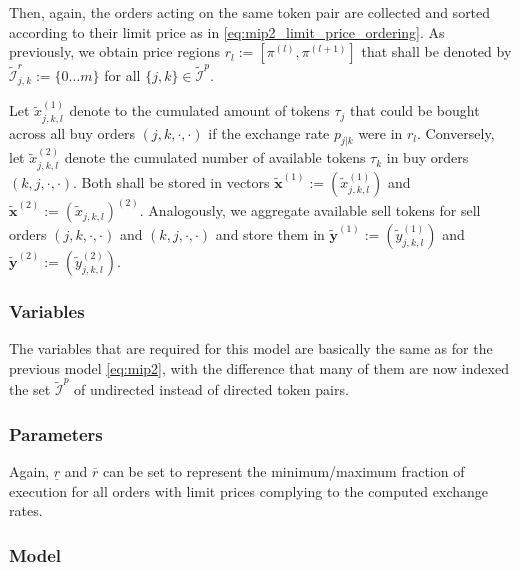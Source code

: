 \documentclass[11pt,parskip=full]{scrartcl}%
\newcommand*{\iutokenpairs}{\tilde{\mathcal{I}}^p}   %
\begin{document}
Then, again, the orders acting on the same token pair are collected and sorted according to their
limit price as in \eqref{eq:mip2_limit_price_ordering}.
As previously, we obtain price regions $ r_l := [\pi^{(l)},\pi^{(l+1)}] $ that shall be denoted by
$ \tilde{\mathcal{I}}_{j,k}^r := \{0 \ldots m\} $ for all $ \{j,k\} \in \iutokenpairs $.

Let $ \tilde{x}_{j,k,l}^{(1)} $ denote to the cumulated amount of tokens $ \tau_j $ that could be
bought across all buy orders $ (j,k,\cdot,\cdot) $ if the exchange rate $ p_{j|k} $ were in
$ r_l $.
Conversely, let $ \tilde{x}_{j,k,l}^{(2)} $ denote the cumulated number of available tokens
$ \tau_k $ in buy orders $ (k,j,\cdot,\cdot) $.
Both shall be stored in vectors $ \tilde{\mathbf{x}}^{(1)} := (\tilde{x}_{j,k,l}^{(1)}) $ and
$ \tilde{\mathbf{x}}^{(2)} := (\tilde{x}_{j,k,l})^{(2)} $.
Analogously, we aggregate available sell tokens for sell orders $ (j,k,\cdot,\cdot) $ and
$ (k,j,\cdot,\cdot) $ and store them in $ \tilde{\mathbf{y}}^{(1)} := (\tilde{y}_{j,k,l}^{(1)}) $
and $ \tilde{\mathbf{y}}^{(2)} := (\tilde{y}_{j,k,l}^{(2)}) $.


\subsubsection*{Variables}

The variables that are required for this model are basically the same as for the previous model
\eqref{eq:mip2}, with the difference that many of them are now indexed the set $ \iutokenpairs $ of
undirected instead of directed token pairs.


\subsubsection*{Parameters}

Again, $ \underline{r} $ and $ \overline{r} $ can be set to represent the minimum/maximum fraction
of execution for all orders with limit prices complying to the computed exchange rates.


\subsubsection*{Model}
\end{document}
